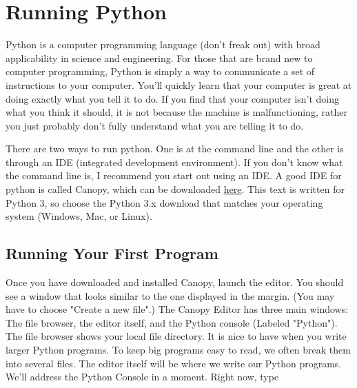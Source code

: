 \chapter{Running Python}
\label{chap:RunningPython}


Python is a computer programming language (don't freak out) with broad
applicability in science and engineering.  For those that are brand
new to computer programming, Python is simply a way to communicate a
set of instructions to your computer.  You'll quickly learn that your
computer is great at doing exactly what you tell it to do.  If you
find that your computer isn't doing what you think it should, it is
not because the machine is malfunctioning, rather you just probably
don't fully understand what you are telling it to do.

There are two ways to run python. One is at the command line and the
other is through an IDE (integrated development environment). If you
don't know what the command line is, I recommend you start out using
an IDE. A good IDE for python is called Canopy, which can
be downloaded \href{https://store.enthought.com/downloads/}{here}. This text is written for Python 3, so choose the Python 3.x download that matches your operating system (Windows, Mac, or Linux).


\section{Running Your First Program}

Once you have downloaded and installed Canopy, launch the editor. You should see a window that looks similar to the one displayed in the margin. (You may have to choose "Create a new file".) The Canopy Editor has three main windows: The file browser, the editor itself, and the Python console (Labeled "Python").
The file browser shows your local file directory.  It is nice to have when you write larger Python programs. To keep big programs easy to read, we often break them into several files.
The editor itself will be where we write our Python programs. We'll address the Python Console in a moment. Right now, type


